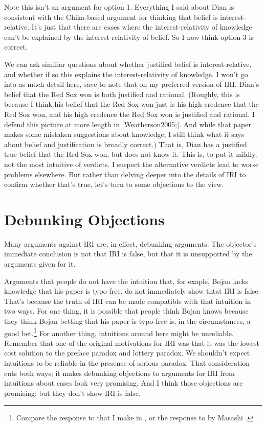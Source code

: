 \documentclass[11pt,oneside]{book}
\begin{document}
Note this isn't an argument for option 1. Everything I said about Dian is consistent with the Chika-based argument for thinking that belief is interest-relative. It's just that there are cases where the interest-relativity of knowledge can't be explained by the interest-relativity of belief. So I now think option 3 is correct.

We can ask similiar questions about whether justified belief is interest-relative, and whether if so this explains the interest-relativity of knowledge. I won't go into as much detail here, save to note that on my preferred version of IRI, Dian's belief that the Red Sox won is both justified and rational. (Roughly, this is because I think his belief that the Red Sox won just is his high credence that the Red Sox won, and his high credence the Red Sox won is justified and rational. I defend this picture at more length in [Weatherson2005;]. And while that paper makes some mistaken suggestions about knowledge, I still think what it says about belief and justification is broadly correct.) That is, Dian has a justified true belief that the Red Sox won, but does not know it. This is, to put it mildly, not the most intuitive of verdicts. I suspect the alternative verdicts lead to worse problems elsewhere. But rather than delving deeper into the details of IRI to confirm whether that's true, let's turn to some objections to the view.

\section{Debunking Objections}
\label{debunkingobjections}

Many arguments against IRI are, in effect, debunking arguments. The objector's immediate conclusion is not that IRI is false, but that it is unsupported by the arguments given for it. 

Arguments that people do not have the intuition that, for exaple, Bojan lacks knowledge that his paper is typo-free, do not immediately show thtat IRI is false. That's because the truth of IRI can be made compatible with that intuition in two ways. For one thing, it is possible that people think Bojan knows because they think Bojan betting that his paper is typo free is, in the circumstances, a good bet.\footnote{Compare the response to  \citet{FeltzZarpentine2010} that I make in  \citet[§1]{Weatherson2011-WEADIR}, or the response to  \citet{Lackey2010} by Masashi  \citet[§5]{Kasaki2014}.} For another thing, intuitions around here might be unreliable. Remember that one of the original motivations for IRI was that it was the lowest cost solution to the preface paradox and lottery paradox. We shouldn't expect intuitions to be reliable in the presence of serious paradox. That consideration cuts both ways; it makes debunking objections to arguments for IRI from intuitions about cases look very promising. And I think those objections are promising; but they don't show IRI is false.
\end{document}
